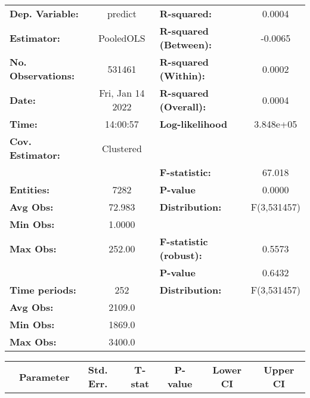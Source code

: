 \begin{center}
\begin{tabular}{lclc}
\toprule
\textbf{Dep. Variable:}    &      predict       & \textbf{  R-squared:         }   &      0.0004      \\
\textbf{Estimator:}        &     PooledOLS      & \textbf{  R-squared (Between):}  &     -0.0065      \\
\textbf{No. Observations:} &       531461       & \textbf{  R-squared (Within):}   &      0.0002      \\
\textbf{Date:}             &  Fri, Jan 14 2022  & \textbf{  R-squared (Overall):}  &      0.0004      \\
\textbf{Time:}             &      14:00:57      & \textbf{  Log-likelihood     }   &    3.848e+05     \\
\textbf{Cov. Estimator:}   &     Clustered      & \textbf{                     }   &                  \\
\textbf{}                  &                    & \textbf{  F-statistic:       }   &      67.018      \\
\textbf{Entities:}         &        7282        & \textbf{  P-value            }   &      0.0000      \\
\textbf{Avg Obs:}          &       72.983       & \textbf{  Distribution:      }   &   F(3,531457)    \\
\textbf{Min Obs:}          &       1.0000       & \textbf{                     }   &                  \\
\textbf{Max Obs:}          &       252.00       & \textbf{  F-statistic (robust):} &      0.5573      \\
\textbf{}                  &                    & \textbf{  P-value            }   &      0.6432      \\
\textbf{Time periods:}     &        252         & \textbf{  Distribution:      }   &   F(3,531457)    \\
\textbf{Avg Obs:}          &       2109.0       & \textbf{                     }   &                  \\
\textbf{Min Obs:}          &       1869.0       & \textbf{                     }   &                  \\
\textbf{Max Obs:}          &       3400.0       & \textbf{                     }   &                  \\
\bottomrule
\end{tabular}
\begin{tabular}{lcccccc}
                & \textbf{Parameter} & \textbf{Std. Err.} & \textbf{T-stat} & \textbf{P-value} & \textbf{Lower CI} & \textbf{Upper CI}  \\

\end{tabular}
\end{center}
